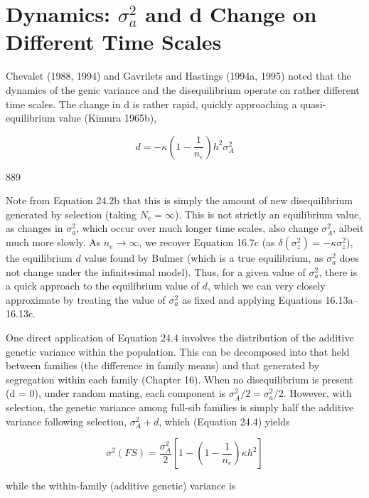 \documentclass{article}
\begin{document}
\section{Dynamics:  $ \sigma_{a}^{2} $ and d Change on Different Time Scales}
Chevalet (1988, 1994) and Gavrilets and Hastings (1994a, 1995) noted that the dynamics of the genic variance and the disequilibrium operate on rather different time scales. The change in d is rather rapid, quickly approaching a quasi-equilibrium value (Kimura 1965b),

\begin{equation}
d=-\kappa\left(1-\frac{1}{n_{e}}\right)h^{2}\sigma_{A}^{2}
\tag{24.4}
\label{eq:24_4}
\end{equation}

889

Note from Equation 24.2b that this is simply the amount of new disequilibrium generated by selection (taking  $ N_e = \infty $). This is not strictly an equilibrium value, as changes in  $ \sigma_a^2 $, which occur over much longer time scales, also change  $ \sigma_A^2 $, albeit much more slowly. As  $ n_e \to \infty $, we recover Equation 16.7c (as  $ \delta(\sigma_z^2) = -\kappa\sigma_z^2 $), the equilibrium  $ d $ value found by Bulmer (which is a true equilibrium, as  $ \sigma_a^2 $ does not change under the infinitesimal model). Thus, for a given value of  $ \sigma_a^2 $, there is a quick approach to the equilibrium value of  $ d $, which we can very closely approximate by treating the value of  $ \sigma_a^2 $ as fixed and applying Equations 16.13a–16.13c.

One direct application of Equation 24.4 involves the distribution of the additive genetic variance within the population. This can be decomposed into that held between families (the difference in family means) and that generated by segregation within each family (Chapter 16). When no disequilibrium is present (d = 0), under random mating, each component is  $ \sigma_A^2 / 2 = \sigma_a^2 / 2 $. However, with selection, the genetic variance among full-sib families is simply half the additive variance following selection,  $ \sigma_A^2 + d $, which (Equation 24.4) yields

\begin{equation}
\sigma^{2}(FS)=\frac{\sigma_{A}^{2}}{2}\left[1-\left(1-\frac{1}{n_{e}}\right)\kappa h^{2}\right]
\tag{24.5a}
\label{eq:24_5a}
\end{equation}

while the within-family (additive genetic) variance is
\end{document}
